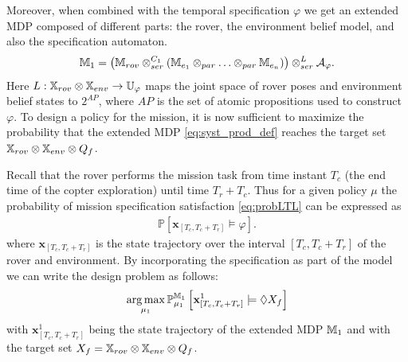 \documentclass[conference]{IEEEtran}
\begin{document}
Moreover, when combined with the temporal specification $\varphi$ we get an extended MDP composed of different parts: the rover, the environment belief model, and also the specification automaton.
 \begin{equation}
\label{eq:syst_prod_def}
	\MDP_1 = \left( \MDP_{rov} \otimes_{ser}^{C_1} \left( \MDP_{e_1} \otimes_{par} \ldots \otimes_{par} \MDP_{e_n} \right) \right) \otimes_{ser}^{L} \mathcal A_{\varphi}.
\end{equation}
Here $L : \mathbb{X}_{rov} \otimes \mathbb{X}_{env} \rightarrow \mathbb{U}_{\varphi}$ maps the joint space of rover poses and environment belief states to $2^{AP}$, where $AP$ is the set of atomic propositions used to construct $\varphi$. To design a policy for the mission, it is now sufficient to maximize the probability that the extended MDP \eqref{eq:syst_prod_def} reaches the target set $\mathbb{X}_{rov} \otimes \mathbb{X}_{env} \otimes Q_f$.

Recall that the rover performs the mission task from time instant $T_c$ (the end time of the copter exploration) until time $T_r + T_c$. Thus for a given policy $\mu$ the probability of mission specification satisfaction \eqref{eq:probLTL} can be expressed as
\begin{equation}
\begin{aligned}
\mathbb{P} \left[ \mathbf{x}_{[T_c,T_c+T_r]} \models \varphi \right].
\end{aligned}
\end{equation}
where $\mathbf{x}_{[T_c,T_c+T_r]}$ is the state trajectory over the interval $[T_c,T_c+T_r]$ of the rover and environment.
By incorporating the specification as part of the model we can write the design problem as follows: %
\begin{equation}
  \label{eq:ev_target}
  \argmax_{\mu_1} \mathbb{P}_{\mu_1}^{\MDP_1} \left[ \mathbf{x}_{[T_c,T_c+T_r]}^1 \models \lozenge X_f \right]
\end{equation}
with  $\mathbf{x}_{[T_c,T_c+T_r]}^1$ being the state trajectory of the extended MDP $\mathbb{M}_1$ and with the target set $X_f=\mathbb{X}_{rov} \otimes \mathbb{X}_{env} \otimes Q_f$.

\end{document}
